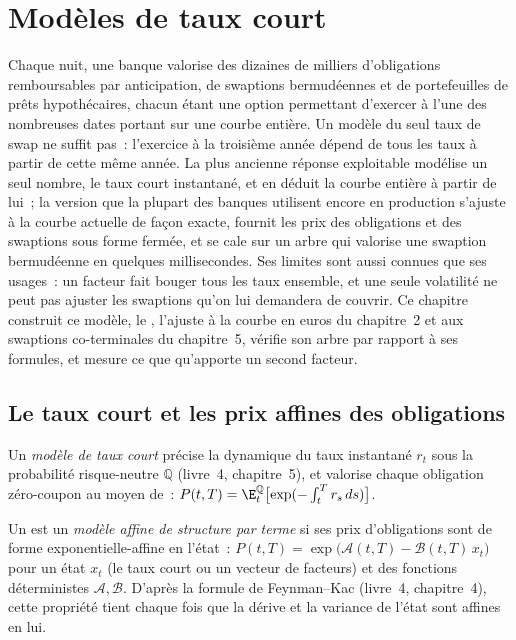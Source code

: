 \chapter{Modèles de taux court}\label{ch:rc:short-rate-models}

Chaque nuit, une banque valorise des dizaines de milliers d'obligations remboursables par anticipation, de swaptions bermudéennes
et de portefeuilles de prêts hypothécaires, chacun étant une option permettant d'exercer à l'une des nombreuses dates
portant sur une courbe entière. Un modèle du seul taux de swap ne suffit pas~: l'exercice à
la troisième année dépend de tous les taux à partir de cette même année. La plus ancienne réponse exploitable
modélise un seul nombre, le taux court instantané, et en déduit la courbe entière
à partir de lui~; la version que la plupart des banques utilisent encore en production s'ajuste à la courbe actuelle
de façon exacte, fournit les prix des obligations et des swaptions sous forme fermée, et se cale sur un arbre qui
valorise une swaption bermudéenne en quelques millisecondes. Ses limites sont aussi connues que ses usages~: un
facteur fait bouger tous les taux ensemble, et une seule volatilité ne peut pas ajuster les
swaptions qu'on lui demandera de couvrir. Ce chapitre construit ce modèle, le
, l'ajuste à la courbe en euros du chapitre~2 et aux
swaptions co-terminales du chapitre~5, vérifie son arbre par rapport à ses formules, et mesure ce que
qu'apporte un second facteur.

\section{Le taux court et les prix affines des obligations}

\begin{definition}\label{def:rc:short-rate-models:short}
Un \emph{modèle de taux court} précise la dynamique du
taux instantané $r_t$ sous la probabilité risque-neutre $\mathbb Q$ (livre~4,
chapitre~5), et valorise chaque obligation zéro-coupon au moyen de~:
$P(t,T) = \E^{\mathbb Q}_t\bigl[\exp(-\int_t^Tr_s\,ds)\bigr]$.
\end{definition}

\begin{definition}\label{def:rc:short-rate-models:affine}
Un  est un \emph{modèle affine de structure par terme}
si ses prix d'obligations sont de forme exponentielle-affine en l'état~:
$P(t,T) = \exp\bigl(\mathcal A(t,T)-\mathcal B(t,T)\,x_t\bigr)$ pour un état $x_t$ (le
taux court ou un vecteur de facteurs) et des fonctions déterministes $\mathcal A,
\mathcal B$. D'après la formule de Feynman--Kac (livre~4, chapitre~4), cette propriété tient
chaque fois que la dérive et la variance de l'état sont affines en lui.
\end{definition}

